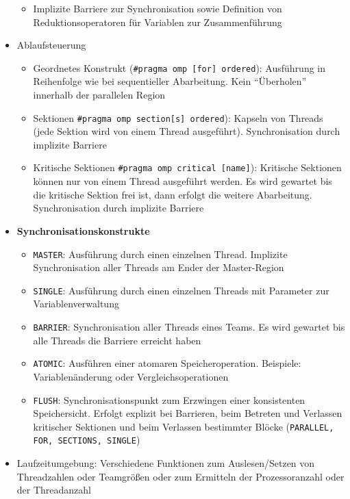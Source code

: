 \begin{itemize}
\begin{itemize}
		\item Implizite Barriere zur Synchronisation sowie Definition von Reduktionsoperatoren für Variablen zur Zusammenführung
	\end{itemize}
	\item Ablaufsteuerung %
	\begin{itemize}
		\item Geordnetes Konstrukt (\texttt{\#pragma omp [for] ordered}): Ausführung in Reihenfolge wie bei sequentieller Abarbeitung. Kein "`Überholen"' innerhalb der parallelen Region
		\item Sektionen \texttt{\#pragma omp section[s] ordered}): Kapseln von Threads (jede Sektion wird von einem Thread ausgeführt). Synchronisation durch implizite Barriere
		\item Kritische Sektionen \texttt{\#pragma omp critical [name]}): Kritische Sektionen können nur von einem Thread ausgeführt werden. Es wird gewartet bis die kritische Sektion frei ist, dann erfolgt die weitere Abarbeitung. Synchronisation durch implizite Barriere
	\end{itemize}
	\item \textbf{Synchronisationskonstrukte} %
	\begin{itemize}
		\item \texttt{MASTER}: Ausführung durch einen einzelnen Thread. Implizite Synchronisation aller Threads am Ender der Master-Region
		\item \texttt{SINGLE}: Ausführung durch einen einzelnen Threads mit Parameter zur Variablenverwaltung
		\item \texttt{BARRIER}: Synchronisation aller Threads eines Teams. Es wird gewartet bis alle Threads die Barriere erreicht haben
		\item \texttt{ATOMIC}: Ausführen einer atomaren Speicheroperation. Beispiele: Variablenänderung oder Vergleichsoperationen
		\item \texttt{FLUSH}: Synchronisationspunkt zum Erzwingen einer konsistenten Speichersicht. Erfolgt explizit bei Barrieren, beim Betreten und Verlassen kritischer Sektionen und beim Verlassen bestimmter Blöcke (\texttt{PARALLEL, FOR, SECTIONS, SINGLE})
	\end{itemize}
	\item Laufzeitumgebung: Verschiedene Funktionen zum Auslesen/Setzen von Threadzahlen oder Teamgrößen oder zum Ermitteln der Prozessoranzahl oder der Threadanzahl
\end{itemize}



